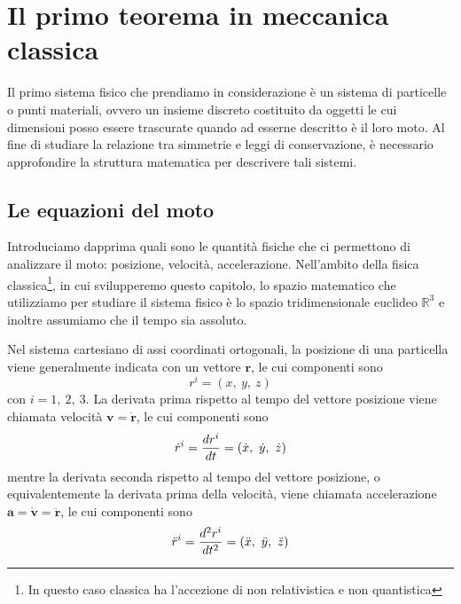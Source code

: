 \chapter{Il primo teorema in meccanica classica}
    
    Il primo sistema fisico che prendiamo in considerazione è un sistema di particelle o punti materiali, ovvero un insieme discreto costituito da oggetti le cui dimensioni posso essere trascurate quando ad esserne descritto è il loro moto. Al fine di studiare la relazione tra simmetrie e leggi di conservazione, è necessario approfondire la struttura matematica per descrivere tali sistemi. 

\section{Le equazioni del moto}
    
    Introduciamo dapprima quali sono le quantità fisiche che ci permettono di analizzare il moto: posizione, velocità, accelerazione. Nell'ambito della fisica classica\footnote{In questo caso classica ha l'accezione di non relativistica e non quantistica}, in cui svilupperemo questo capitolo, lo spazio matematico che utilizziamo per studiare il sistema fisico è lo spazio tridimensionale euclideo $\mathbb R^3$ e inoltre assumiamo che il tempo sia assoluto.
    
    Nel sistema cartesiano di assi coordinati ortogonali, la posizione di una particella viene generalmente indicata con un vettore $\mathbf r$, le cui componenti sono 
    \begin{equation*}
        r^i = (x, ~y, ~z)
    \end{equation*}
    con $i = 1, ~2, ~3$. La derivata prima rispetto al tempo del vettore posizione viene chiamata velocità $\mathbf v = \mathbf {\dot r}$, le cui componenti sono 
    \begin{equation*}
        \dot r^i = \frac{dr^i}{dt} = (\dot x, ~\dot y, ~\dot z)
    \end{equation*}
    mentre la derivata seconda rispetto al tempo del vettore posizione, o equivalentemente la derivata prima della velocità, viene chiamata accelerazione $\mathbf a = \mathbf{\dot v} = \mathbf{\ddot r}$, le cui componenti sono 
    \begin{equation*}
        \ddot r^i = \frac{d^2r^i}{dt^2} = (\ddot x, ~\ddot y, ~\ddot z)
    \end{equation*}
    
